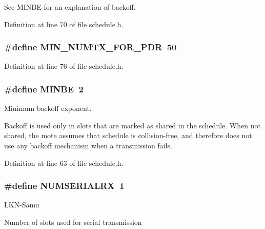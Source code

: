 See M\+I\+N\+BE for an explanation of backoff. 

Definition at line 70 of file schedule.\+h.

\subsubsection[{\texorpdfstring{M\+I\+N\+\_\+\+N\+U\+M\+T\+X\+\_\+\+F\+O\+R\+\_\+\+P\+DR}{MIN_NUMTX_FOR_PDR}}]{\setlength{\rightskip}{0pt plus 5cm}\#define M\+I\+N\+\_\+\+N\+U\+M\+T\+X\+\_\+\+F\+O\+R\+\_\+\+P\+DR~50}\hypertarget{group___schedule_ga9f09f2107f559401598f179a3a8cabe6}{}\label{group___schedule_ga9f09f2107f559401598f179a3a8cabe6}


Definition at line 76 of file schedule.\+h.

\subsubsection[{\texorpdfstring{M\+I\+N\+BE}{MINBE}}]{\setlength{\rightskip}{0pt plus 5cm}\#define M\+I\+N\+BE~2}\hypertarget{group___schedule_ga731698f6cbe05cc416f1116762b2dc49}{}\label{group___schedule_ga731698f6cbe05cc416f1116762b2dc49}


Minimum backoff exponent. 

Backoff is used only in slots that are marked as shared in the schedule. When not shared, the mote assumes that schedule is collision-\/free, and therefore does not use any backoff mechanism when a transmission fails. 

Definition at line 63 of file schedule.\+h.

\subsubsection[{\texorpdfstring{N\+U\+M\+S\+E\+R\+I\+A\+L\+RX}{NUMSERIALRX}}]{\setlength{\rightskip}{0pt plus 5cm}\#define N\+U\+M\+S\+E\+R\+I\+A\+L\+RX~1}\hypertarget{group___schedule_ga5206eabfac75eeed6f5066fb6d00f7c3}{}\label{group___schedule_ga5206eabfac75eeed6f5066fb6d00f7c3}
\begin{DoxyRefDesc}{L\+K\+N-\/\+Samu}
\item[\hyperlink{_l_k_n_code_edits__LKN_code_edits000023}{L\+K\+N-\/\+Samu}]Number of slots used for serial transmission \end{DoxyRefDesc}


